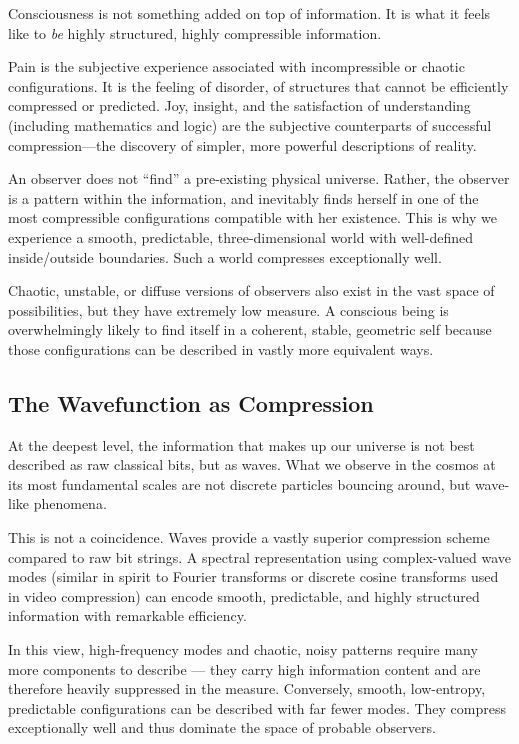 Consciousness is not something added on top of information. It is what it feels like to \emph{be} highly structured, highly compressible information.

Pain is the subjective experience associated with incompressible or chaotic configurations. It is the feeling of disorder, of structures that cannot be efficiently compressed or predicted. Joy, insight, and the satisfaction of understanding (including mathematics and logic) are the subjective counterparts of successful compression---the discovery of simpler, more powerful descriptions of reality.

An observer does not ``find'' a pre-existing physical universe. Rather, the observer is a pattern within the information, and inevitably finds herself in one of the most compressible configurations compatible with her existence. This is why we experience a smooth, predictable, three-dimensional world with well-defined inside/outside boundaries. Such a world compresses exceptionally well.

Chaotic, unstable, or diffuse versions of observers also exist in the vast space of possibilities, but they have extremely low measure. A conscious being is overwhelmingly likely to find itself in a coherent, stable, geometric self because those configurations can be described in vastly more equivalent ways.


\subsection*{The Wavefunction as Compression}

At the deepest level, the information that makes up our universe is not best described as raw classical bits, but as waves. What we observe in the cosmos at its most fundamental scales are not discrete particles bouncing around, but wave-like phenomena.

This is not a coincidence. Waves provide a vastly superior compression scheme compared to raw bit strings. A spectral representation using complex-valued wave modes (similar in spirit to Fourier transforms or discrete cosine transforms used in video compression) can encode smooth, predictable, and highly structured information with remarkable efficiency.

In this view, high-frequency modes and chaotic, noisy patterns require many more components to describe --- they carry high information content and are therefore heavily suppressed in the measure. Conversely, smooth, low-entropy, predictable configurations can be described with far fewer modes. They compress exceptionally well and thus dominate the space of probable observers.

